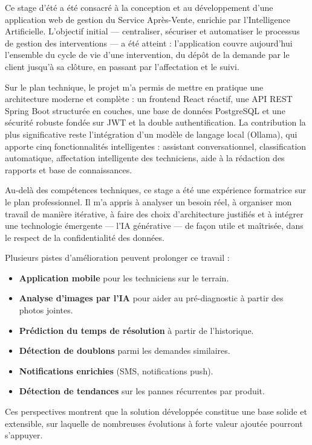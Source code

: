 
Ce stage d'été a été consacré à la conception et au développement d'une application web de gestion du Service Après-Vente, enrichie par l'Intelligence Artificielle. L'objectif initial — centraliser, sécuriser et automatiser le processus de gestion des interventions — a été atteint : l'application couvre aujourd'hui l'ensemble du cycle de vie d'une intervention, du dépôt de la demande par le client jusqu'à sa clôture, en passant par l'affectation et le suivi.

Sur le plan technique, le projet m'a permis de mettre en pratique une architecture moderne et complète : un frontend React réactif, une API REST Spring Boot structurée en couches, une base de données PostgreSQL et une sécurité robuste fondée sur JWT et la double authentification. La contribution la plus significative reste l'intégration d'un modèle de langage local (Ollama), qui apporte cinq fonctionnalités intelligentes : assistant conversationnel, classification automatique, affectation intelligente des techniciens, aide à la rédaction des rapports et base de connaissances.

Au-delà des compétences techniques, ce stage a été une expérience formatrice sur le plan professionnel. Il m'a appris à analyser un besoin réel, à organiser mon travail de manière itérative, à faire des choix d'architecture justifiés et à intégrer une technologie émergente — l'IA générative — de façon utile et maîtrisée, dans le respect de la confidentialité des données.

Plusieurs pistes d'amélioration peuvent prolonger ce travail :
\begin{itemize}
  \item \textbf{Application mobile} pour les techniciens sur le terrain.
  \item \textbf{Analyse d'images par l'IA} pour aider au pré-diagnostic à partir des photos jointes.
  \item \textbf{Prédiction du temps de résolution} à partir de l'historique.
  \item \textbf{Détection de doublons} parmi les demandes similaires.
  \item \textbf{Notifications enrichies} (SMS, notifications push).
  \item \textbf{Détection de tendances} sur les pannes récurrentes par produit.
\end{itemize}

Ces perspectives montrent que la solution développée constitue une base solide et extensible, sur laquelle de nombreuses évolutions à forte valeur ajoutée pourront s'appuyer.
